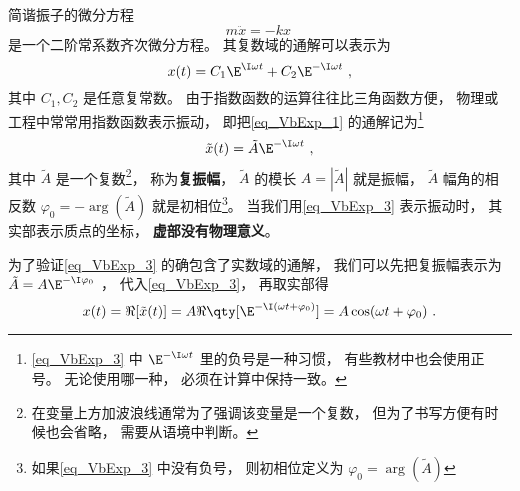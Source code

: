

简谐振子的微分方程
\begin{equation}\label{eq_VbExp_1}
m\ddot x =  - kx~
\end{equation}
是一个二阶常系数齐次微分方程。 其复数域的通解可以表示为
\begin{equation}
x(t) = C_1 \E^{\I \omega t} + C_2 \E^{-\I \omega t}~,
\end{equation}
其中 $C_1, C_2$ 是任意复常数。 由于指数函数的运算往往比三角函数方便， 物理或工程中常常用指数函数表示振动， 即把\autoref{eq_VbExp_1} 的通解记为\footnote{\autoref{eq_VbExp_3} 中 $\E^{-\I \omega t}$ 里的负号是一种习惯， 有些教材中也会使用正号。 无论使用哪一种， 必须在计算中保持一致。}
\begin{equation}\label{eq_VbExp_3}
\tilde x(t) = \tilde A \E^{-\I \omega t}~,
\end{equation}
其中 $\tilde A$ 是一个复数\footnote{在变量上方加波浪线通常为了强调该变量是一个复数， 但为了书写方便有时候也会省略， 需要从语境中判断。}， 称为\textbf{复振幅}， $\tilde A$ 的模长 $A = |\tilde A|$ 就是振幅， $\tilde A$ 幅角的相反数 $\varphi_0 = -\arg(\tilde A)$ 就是初相位\footnote{如果\autoref{eq_VbExp_3} 中没有负号， 则初相位定义为 $\varphi_0 = \arg(\tilde A)$}。 当我们用\autoref{eq_VbExp_3} 表示振动时， 其实部表示质点的坐标， \textbf{虚部没有物理意义}。

为了验证\autoref{eq_VbExp_3} 的确包含了实数域的通解， 我们可以先把复振幅表示为 $\tilde A = A\E^{-\I \varphi_0}$%
， 代入\autoref{eq_VbExp_3}， 再取实部得
\begin{equation}\label{eq_VbExp_2}
x(t) = \Re[\tilde x(t)] = A\Re \qty[\E^{-\I (\omega t + \varphi_0)}] = A \cos(\omega t + \varphi_0)~.
\end{equation}

